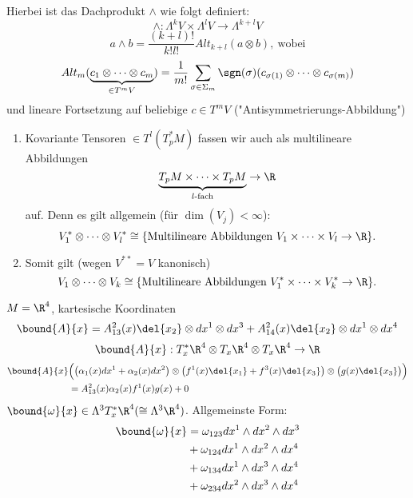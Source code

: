 Hierbei ist das Dachprodukt $\wedge$ wie folgt definiert:
\[ \wedge: \Lambda^k V \times \Lambda^l V \to \Lambda^{k+l} V \]
\[ a \wedge b = \frac{(k+l)!}{k!l!} Alt_{k+l} (a\otimes b),\ \text{wobei} \]
\[ Alt_m (\underbrace{c_1 \otimes \dots \otimes c_m}_{\in T^mV}) = \frac{1}{m!} \sum_{\sigma \in \Sigma_m} \sgn(\sigma) (c_{\sigma(1)} \otimes \dots \otimes c_{\sigma(m)}) \]
und lineare Fortsetzung auf beliebige $c \in T^m V$ ("Antisymmetrierungs-Abbildung")

\begin{rem}
	\begin{enumerate}[label={\roman*})]
		\item Kovariante Tensoren $ \in T^l(T_p^*M) $ fassen wir auch als multilineare Abbildungen
			\[ \underbrace{T_pM \times \dots \times T_pM}_{l\text{-fach}} \to \R \]
			auf. Denn es gilt allgemein (für $\dim(V_j)<\infty$):
			\[ V_1^* \otimes \dots \otimes V_l^* \cong \{ \text{Multilineare Abbildungen } V_1 \times \dots \times V_l \to \R \}. \]
		\item Somit gilt (wegen $V^{**} = V$ kanonisch)
			\[ V_1 \otimes \dots \otimes V_k \cong \{ \text{Multilineare Abbildungen } V_1^* \times \dots \times V_k^* \to \R \}. \]
	\end{enumerate}
\end{rem}

\begin{exmp*}
	$ M = \R^4 $, kartesische Koordinaten
	\[ \bound{A}{x} = A_{13}^2(x) \del{x_2} \otimes dx^1 \otimes dx^3 + A_{14}^2(x) \del{x_2} \otimes dx^1 \otimes dx^4 \]
	\[ \bound{A}{x} : T_x^*\R^4 \otimes T_x\R^4 \otimes T_x\R^4 \to \R \]
	\begin{align*}
		\bound{A}{x} &\Big( \big(\alpha_1(x) dx^1 + \alpha_2(x) dx^2\big) \otimes \big(f^1(x)\del{x_1} + f^3(x)\del{x_3}\big) \otimes \big(g(x) \del{x_3}\big) \Big) \\&= A_{13}^2(x) \alpha_2(x) f^1(x) g(x) + 0
	\end{align*}
	$ \bound{\omega}{x} \in \Lambda^3 T_x^*\R^4 (\cong \Lambda^3 \R^4) $. Allgemeinste Form:
	\begin{align*}
		\bound{\omega}{x} &= \omega_{123} dx^1 \wedge dx^2 \wedge dx^3\\
		&+ \omega_{124} dx^1 \wedge dx^2 \wedge dx^4\\
		&+ \omega_{134} dx^1 \wedge dx^3 \wedge dx^4\\
		&+ \omega_{234} dx^2 \wedge dx^3 \wedge dx^4
	\end{align*}
\end{exmp*}

